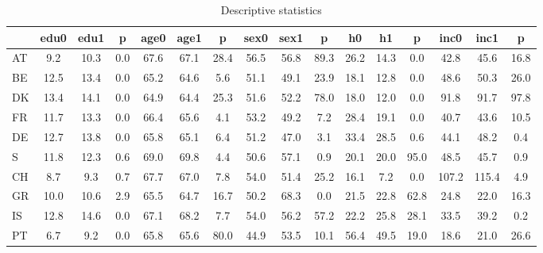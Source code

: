 \begin{table}[htbp]
\caption{\label{clabel} Descriptive statistics}\centering\medskip
\begin{tabular}{lccccccccccccccc} \hline \hline
 & edu0  & edu1  & p  & age0  & age1  & p  & sex0  & sex1  & p  & h0  & h1  & p  & inc0  & inc1  & p  \\  \hline 
AT &       9.2 &      10.3 &       0.0 &      67.6 &      67.1 &      28.4 &      56.5 &      56.8 &      89.3 &      26.2 &      14.3 &       0.0 &      42.8 &      45.6 &      16.8 \\  
BE &      12.5 &      13.4 &       0.0 &      65.2 &      64.6 &       5.6 &      51.1 &      49.1 &      23.9 &      18.1 &      12.8 &       0.0 &      48.6 &      50.3 &      26.0 \\  
DK &      13.4 &      14.1 &       0.0 &      64.9 &      64.4 &      25.3 &      51.6 &      52.2 &      78.0 &      18.0 &      12.0 &       0.0 &      91.8 &      91.7 &      97.8 \\  
FR &      11.7 &      13.3 &       0.0 &      66.4 &      65.6 &       4.1 &      53.2 &      49.2 &       7.2 &      28.4 &      19.1 &       0.0 &      40.7 &      43.6 &      10.5 \\  
DE &      12.7 &      13.8 &       0.0 &      65.8 &      65.1 &       6.4 &      51.2 &      47.0 &       3.1 &      33.4 &      28.5 &       0.6 &      44.1 &      48.2 &       0.4 \\  
S &      11.8 &      12.3 &       0.6 &      69.0 &      69.8 &       4.4 &      50.6 &      57.1 &       0.9 &      20.1 &      20.0 &      95.0 &      48.5 &      45.7 &       0.9 \\  
CH &       8.7 &       9.3 &       0.7 &      67.7 &      67.0 &       7.8 &      54.0 &      51.4 &      25.2 &      16.1 &       7.2 &       0.0 &     107.2 &     115.4 &       4.9 \\  
GR &      10.0 &      10.6 &       2.9 &      65.5 &      64.7 &      16.7 &      50.2 &      68.3 &       0.0 &      21.5 &      22.8 &      62.8 &      24.8 &      22.0 &      16.3 \\  
IS &      12.8 &      14.6 &       0.0 &      67.1 &      68.2 &       7.7 &      54.0 &      56.2 &      57.2 &      22.2 &      25.8 &      28.1 &      33.5 &      39.2 &       0.2 \\  
PT &       6.7 &       9.2 &       0.0 &      65.8 &      65.6 &      80.0 &      44.9 &      53.5 &      10.1 &      56.4 &      49.5 &      19.0 &      18.6 &      21.0 &      26.6 \\  

\end{tabular}
\end{table}
